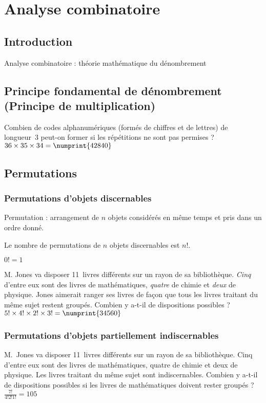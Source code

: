 \chapter{Analyse combinatoire}
\section{Introduction}
Analyse combinatoire : théorie mathématique du dénombrement



\section[Principe fondamental de dénombrement (Principe de multiplication)]{Principe fondamental de dénombrement\\(Principe de multiplication)}

 Combien de codes alphanumériques (formés de chiffres et de lettres) de longueur~3 peut-on former si les répétitions ne sont pas permises ?
\sol $36 \times 35 \times 34 = \numprint{42840}$



\section{Permutations}
\subsection{Permutations d’objets discernables}
Permutation : arrangement de $n$ objets considérés en même temps et pris dans un ordre donné.

Le nombre de permutations de $n$ objets discernables est $n!$.

$0! = 1$

 M. Jones va disposer 11~livres différents sur un rayon de sa bibliothèque. \emph{Cinq} d’entre eux sont des livres de mathématiques, \emph{quatre} de chimie et \emph{deux} de physique. Jones aimerait ranger ses livres de façon que tous les livres traitant du même sujet restent groupés. Combien y a-t-il de dispositions possibles ?
 $5! \times 4! \times 2! \times 3! = \numprint{34560}$


\subsection{Permutations d’objets partiellement indiscernables}
 M.~Jones va disposer 11~livres différents sur un rayon de sa bibliothèque. Cinq d’entre eux sont des livres de mathématiques, quatre de chimie et deux de physique. Les livres traitant du même sujet sont indiscernables. Combien y a-t-il de dispositions possibles si les livres de mathématiques doivent rester groupés ?
\sol $\frac{7!}{4!2!1!} = 105$

